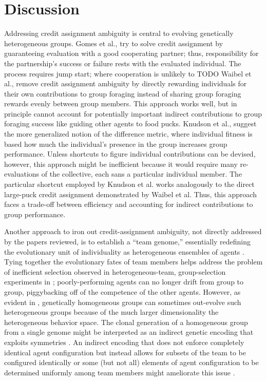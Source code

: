\section{Discussion}

Addressing credit assignment ambiguity is central to evolving genetically heterogeneous groups.
Gomes et al., try to solve credit assignment by guaranteeing evaluation with a good cooperating partner;
thus, responsibility for the partnership's success or failure rests with the evaluated individual.
The process requires jump start; where cooperation is unlikely to TODO
Waibel et al., remove credit assignment ambiguity by directly rewarding individuals for their own contributions to group foraging instead of sharing group foraging rewards evenly between group members.
This approach works well, but in principle cannot account for potentially important indirect contributions to group foraging success like guiding other agents to food pucks.
Knudson et al., suggest the more generalized notion of the difference metric, where individual fitness is based how much the individual's presence in the group increases group performance.
Unless shortcuts to figure individual contributions can be devised, however, this approach might be inefficient because it would require many re-evaluations of the collective, each sans a particular individual member.
The particular shortcut employed by Knudson et al. works analogously to the direct large-puck credit assignment demonstrated by Waibel et al.
Thus, this approach faces a trade-off between efficiency and accounting for indirect contributions to group performance.

Another approach to iron out credit-assignment ambiguity, not directly addressed by the papers reviewed, is to establish a ``team genome,'' essentially redefining the evolutionary unit of individuality as heterogeneous ensembles of agents \cite{miconi2003evolving}.
Tying together the evolutionary fates of team members helps address the problem of inefficient selection observed in heterogeneous-team, group-selection experiments in \cite{waibel2009genetic};
poorly-performing agents can no longer drift from group to group, piggybacking off of the competence of the other agents.
However, as evident in \cite{waibel2009genetic}, genetically homogeneous groups can sometimes out-evolve such heterogeneous groups because of the much larger dimensionality the heterogeneous behavior space.
The clonal generation of a homogeneous group from a single genome might be interpreted as an indirect genetic encoding that exploits symmetries \cite{clune2011performance}.
An indirect encoding that does not enforce completely identical agent configuration but instead allows for subsets of the team to be configured identically or some (but not all) elements of agent configuration to be determined uniformly among team members might ameliorate this issue \cite{bongard2000legion}.

